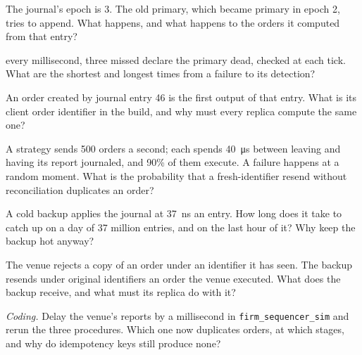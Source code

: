 \begin{exercise}[$\star$]\label{exo:ll:resilience:1}
The journal's epoch is 3. The old primary, which became primary in epoch 2, tries to append. What happens, and what happens to
the orders it computed from that entry?
\end{exercise}

\begin{exercise}[$\star$]\label{exo:ll:resilience:2}
 every millisecond, three missed declare the primary dead, checked at each  tick. What are the shortest
and longest times from a failure to its detection?
\end{exercise}

\begin{exercise}[$\star$]\label{exo:ll:resilience:3}
An order created by journal entry 46 is the first output of that entry. What is its client order identifier in the build, and
why must every replica compute the same one?
\end{exercise}

\begin{exercise}[$\star\star$]\label{exo:ll:resilience:4}
A strategy sends 500 orders a second; each spends \qty{40}{\micro\second} between leaving and having its report journaled, and
90\% of them execute. A failure happens at a random moment. What is the probability that a fresh-identifier resend without
reconciliation duplicates an order?
\end{exercise}

\begin{exercise}[$\star\star$]\label{exo:ll:resilience:5}
A cold backup applies the journal at \qty{37}{\nano\second} an entry. How long does it take to catch up on a day of 37 million
entries, and on the last hour of it? Why keep the backup hot anyway?
\end{exercise}

\begin{exercise}[$\star\star$]\label{exo:ll:resilience:6}
The venue rejects a copy of an order under an identifier it has seen. The backup resends under original identifiers an order
the venue executed. What does the backup receive, and what must its replica do with it?
\end{exercise}

\begin{exercise}[$\star\star\star$]\label{exo:ll:resilience:7}
\emph{Coding.} Delay the venue's reports by a millisecond in \texttt{firm\_sequencer\_sim} and rerun the three procedures.
Which one now duplicates orders, at which stages, and why do idempotency keys still produce none?
\end{exercise}


